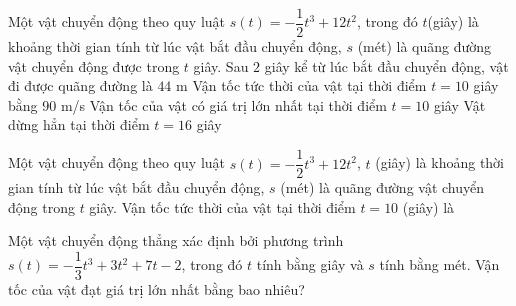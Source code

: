 \begin{ex}%
 Một vật chuyển động theo quy luật $s(t) = -\dfrac{1}{2} t^3 + 12t^2$, trong đó  $t$(giây) là khoảng thời gian tính từ lúc vật bắt đầu chuyển động, $s$ (mét) là quãng đường vật chuyển động được trong $t$ giây.
  \choiceTF
  {\True Sau $2$ giây kể từ lúc bắt đầu chuyển động, vật đi được quãng  đường là $44$ m}
  {\True Vận tốc tức thời của vật tại thời điểm $t =  10$ giây bằng $90$ m/s}
  {Vận tốc của vật có giá trị lớn  nhất tại thời điểm $t=10$ giây}
  {\True Vật dừng hẳn tại thời điểm $t=16$  giây}
\end{ex}

\begin{ex}%
	Một vật chuyển  động theo quy luật $s(t)=-\dfrac{1}{2}t^3+12t^2$, $t$ (giây) là khoảng thời gian tính từ lúc vật bắt đầu chuyển động, $s$ (mét) là quãng đường vật chuyển động trong $t$ giây. Vận tốc tức thời của vật tại thời điểm $t=10$ (giây) là
\end{ex}

\begin{ex}%
	Một vật chuyển động thẳng xác định bởi phương trình $s(t)=-\dfrac{1}{3}t^3+3t^2+7t-2$, trong đó $t$ tính bằng giây và $s$ tính bằng mét. Vận tốc của vật đạt giá trị lớn nhất bằng bao  nhiêu?
\end{ex}

